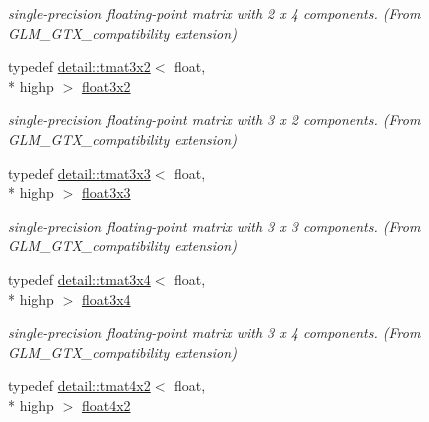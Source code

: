 \begin{DoxyCompactItemize}
\begin{DoxyCompactList}\small\item\em single-\/precision floating-\/point matrix with 2 x 4 components. (From G\-L\-M\-\_\-\-G\-T\-X\-\_\-compatibility extension) \end{DoxyCompactList}\item 
\hypertarget{group__gtx__compatibility_ga19bcbd4d65c70cd07907b2d688bc84ed}{typedef \hyperlink{structglm_1_1detail_1_1tmat3x2}{detail\-::tmat3x2}$<$ float, \\*
highp $>$ \hyperlink{group__gtx__compatibility_ga19bcbd4d65c70cd07907b2d688bc84ed}{float3x2}}\label{group__gtx__compatibility_ga19bcbd4d65c70cd07907b2d688bc84ed}

\begin{DoxyCompactList}\small\item\em single-\/precision floating-\/point matrix with 3 x 2 components. (From G\-L\-M\-\_\-\-G\-T\-X\-\_\-compatibility extension) \end{DoxyCompactList}\item 
\hypertarget{group__gtx__compatibility_ga11458ecd63c32b7e502d90091a6d0a6c}{typedef \hyperlink{structglm_1_1detail_1_1tmat3x3}{detail\-::tmat3x3}$<$ float, \\*
highp $>$ \hyperlink{group__gtx__compatibility_ga11458ecd63c32b7e502d90091a6d0a6c}{float3x3}}\label{group__gtx__compatibility_ga11458ecd63c32b7e502d90091a6d0a6c}

\begin{DoxyCompactList}\small\item\em single-\/precision floating-\/point matrix with 3 x 3 components. (From G\-L\-M\-\_\-\-G\-T\-X\-\_\-compatibility extension) \end{DoxyCompactList}\item 
\hypertarget{group__gtx__compatibility_ga53eb75b08b92aa34886397150c983943}{typedef \hyperlink{structglm_1_1detail_1_1tmat3x4}{detail\-::tmat3x4}$<$ float, \\*
highp $>$ \hyperlink{group__gtx__compatibility_ga53eb75b08b92aa34886397150c983943}{float3x4}}\label{group__gtx__compatibility_ga53eb75b08b92aa34886397150c983943}

\begin{DoxyCompactList}\small\item\em single-\/precision floating-\/point matrix with 3 x 4 components. (From G\-L\-M\-\_\-\-G\-T\-X\-\_\-compatibility extension) \end{DoxyCompactList}\item 
\hypertarget{group__gtx__compatibility_gab805aa2d6bbd5edddf78bd2e9322e6c7}{typedef \hyperlink{structglm_1_1detail_1_1tmat4x2}{detail\-::tmat4x2}$<$ float, \\*
highp $>$ \hyperlink{group__gtx__compatibility_gab805aa2d6bbd5edddf78bd2e9322e6c7}{float4x2}}\label{group__gtx__compatibility_gab805aa2d6bbd5edddf78bd2e9322e6c7}


\end{DoxyCompactItemize}
